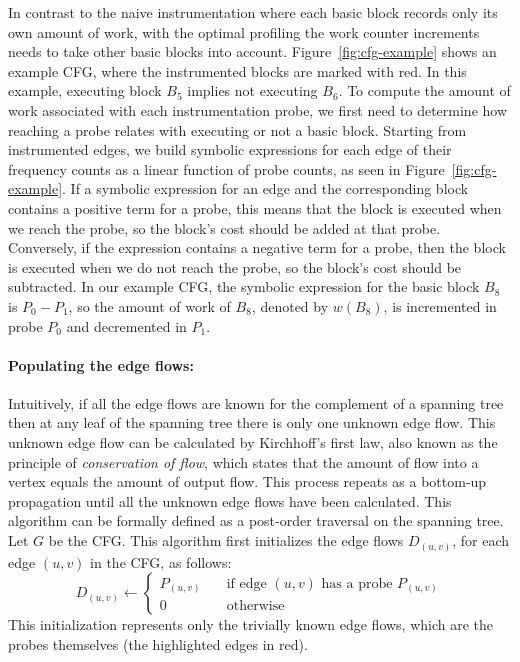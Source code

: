 In contrast to the naive instrumentation where each basic block records only its own amount of work, with the optimal profiling the work
counter increments needs to take other basic blocks into account. Figure~\ref{fig:cfg-example} shows an example CFG, where the instrumented
blocks are marked with red. In this example, executing block $B_5$ implies not executing $B_6$. To compute the amount of work associated
with each instrumentation probe, we first need to determine how reaching a probe relates with executing or not a basic block. Starting from
instrumented edges, we build symbolic expressions for each edge of their frequency counts as a linear function of probe counts, as seen in
Figure~\ref{fig:cfg-example}. If a symbolic expression for an edge and the corresponding block contains a positive term for a probe, this
means that the block is executed when we reach the probe, so the block's cost should be added at that probe. Conversely, if the expression
contains a negative term for a probe, then the block is executed when we do not reach the probe, so the block's cost should be subtracted.
In our example CFG, the symbolic expression for the basic block $B_8$ is $P_0 - P_1$, so the amount of work of $B_8$, denoted by $w(B_8)$,
is incremented in probe $P_0$ and decremented in $P_1$.

\paragraph{Populating the edge flows:}
Intuitively, if all the edge flows are known for the complement of a spanning tree then at any leaf of the spanning tree there is only one
unknown edge flow. This unknown edge flow can be calculated by Kirchhoff's first law\cite{knuth73,ball94},
also known as the principle of \textit{conservation of flow}, which states that
the amount of flow into a vertex equals the amount of output flow.
This process repeats as a bottom-up propagation until all the unknown edge flows have been calculated. This algorithm can be formally defined as a post-order traversal on the
spanning tree. Let $G$ be the CFG. This algorithm first initializes the edge flows $D_{(u,v)}$, for each edge $(u,v)$ in the CFG, as
follows:
\[
D_{(u,v)} \gets
\begin{cases}
    P_{(u,v)} & \quad \text{if edge $(u,v)$ has a probe $P_{(u,v)}$}\\
    0       & \quad \text{otherwise}
\end{cases}
\]
This initialization represents only the trivially known edge flows, which are the
probes themselves (the highlighted edges in red).

